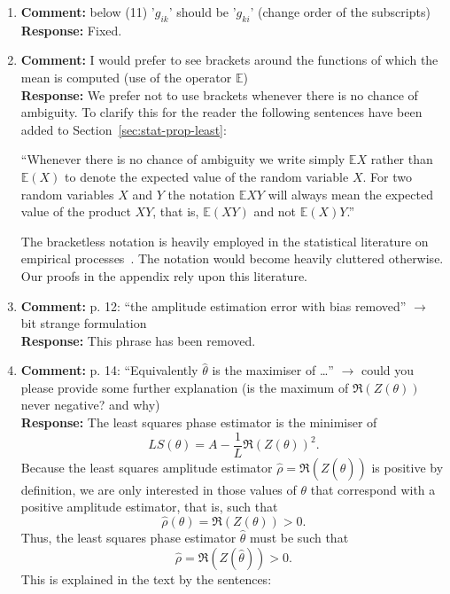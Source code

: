 \documentclass{article}
\newcommand{\expect}{{\mathbb E}}
\begin{document}
\begin{enumerate}
\item \textbf{Comment:} below (11) '$g_{ik}$' should be '$g_{ki}$' (change order of the subscripts) \\
\textbf{Response:} Fixed.

\item \label{rev2:commentE} \textbf{Comment:} I would prefer to see brackets around the functions of which the mean is computed (use of the operator $\mathbb E$) \\
\textbf{Response:} We prefer not to use brackets whenever there is no chance of ambiguity.  To clarify this for the reader the following sentences have been added to Section~\ref{sec:stat-prop-least}:

``Whenever there is no chance of ambiguity we write simply $\expect X$ rather than $\expect(X)$ to denote the expected value of the random variable $X$.  For two random variables $X$ and $Y$ the notation $\expect X Y$ will always mean the expected value of the product $XY$, that is, $\expect(XY)$ and not $\expect(X)Y$.''

The bracketless notation is heavily employed in the statistical literature on empirical processes~\cite{Pollard_new_ways_clts_1986,Pollard_conv_stat_proc_1984,Pollard_asymp_empi_proc_1989,van2009empirical}. The notation would become heavily cluttered otherwise.  Our proofs in the appendix rely upon this literature.

\item \textbf{Comment:} p. 12: ``the amplitude estimation error with bias removed'' $\to$ bit strange formulation \\
\textbf{Response:} This phrase has been removed.

\item \textbf{Comment:} p. 14: ``Equivalently $\hat\theta$ is the maximiser of \dots'' $\to$ could you please provide some further explanation (is the maximum of $\Re(Z(\theta))$ never negative? and why) \\
\textbf{Response:} The least squares phase estimator is the minimiser of
\[
LS(\theta) = A - \frac{1}{L}\Re(Z(\theta))^2.
\]
Because the least squares amplitude estimator $\hat{\rho} = \Re(Z(\hat{\theta}))$ is positive by definition, we are only interested in those values of $\theta$ that correspond with a positive amplitude estimator, that is, such that
\[
\hat{\rho}(\theta) = \Re(Z(\theta)) > 0.
\]
Thus, the least squares phase estimator $\hat{\theta}$ must be such that
\[
\hat{\rho} = \Re(Z(\hat{\theta})) > 0.
\]
This is explained in the text by the sentences:


\end{enumerate}
\end{document}
